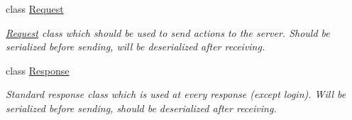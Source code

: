 \begin{DoxyCompactItemize}
class \hyperlink{classCore_1_1Connections_1_1Request}{Request}
\begin{DoxyCompactList}\small\item\em \hyperlink{classCore_1_1Connections_1_1Request}{Request} class which should be used to send actions to the server. Should be serialized before sending, will be deserialized after receiving. \end{DoxyCompactList}\item 
class \hyperlink{classCore_1_1Connections_1_1Response}{Response}
\begin{DoxyCompactList}\small\item\em Standard response class which is used at every response (except login). Will be serialized before sending, should be deserialized after receiving. \end{DoxyCompactList}\end{DoxyCompactItemize}
